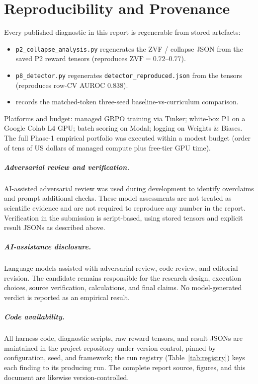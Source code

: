 \documentclass[12pt,a4paper]{report}
\newcommand{\zvf}{\mathrm{ZVF}}
\begin{document}
\chapter{Reproducibility and Provenance}
\label{app:repro}
Every published diagnostic in this report is regenerable from stored artefacts:
\begin{itemize}[leftmargin=1.4em,itemsep=1pt]
  \item \texttt{p2\_collapse\_analysis.py} regenerates the ZVF / collapse JSON from
  the saved P2 reward tensors (reproduces $\zvf=0.72$--$0.77$).
  \item \texttt{p8\_detector.py} regenerates \texttt{detector\_reproduced.json} from
  the  tensors (reproduces row-CV AUROC $0.838$).
  \item {} records the matched-token
  three-seed baseline-vs-curriculum comparison.
\end{itemize}
Platforms and budget: managed GRPO training via Tinker; white-box P1 on a Google
Colab L4 GPU; batch scoring on Modal; logging on Weights \& Biases. The full
Phase-1 empirical portfolio was executed within a modest budget (order of tens of
US dollars of managed compute plus free-tier GPU time).

\paragraph{Adversarial review and verification.} AI-assisted adversarial review was
used during development to identify overclaims and prompt additional checks. These
model assessments are not treated as scientific evidence and are not required to
reproduce any number in the report. Verification in the submission is script-based,
using stored tensors and explicit result JSONs as described above.

\paragraph{AI-assistance disclosure.} Language models assisted with adversarial
review, code review, and editorial revision. The candidate remains responsible for
the research design, execution choices, source verification, calculations, and final
claims. No model-generated verdict is reported as an empirical result.

\paragraph{Code availability.} All harness code, diagnostic scripts, raw reward tensors,
and result JSONs are maintained in the project repository under version control, pinned
by configuration, seed, and framework; the run registry (Table~\ref{tab:registry}) keys
each finding to its producing run. The complete report source, figures, and this
document are likewise version-controlled.
\end{document}
